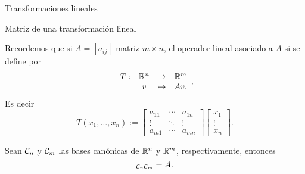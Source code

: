 \begin{chapter}{Transformaciones lineales}
\begin{section}{Matriz de una transformaci\'on lineal}
        
            \begin{observacion*}
                Recordemos que si  $A = [a_{ij}]$ matriz $m \times n$, el operador lineal asociado a $A$ si se define por 
                \begin{align*}
                    \begin{array}{rccc}
                        T : &\mathbb R^n &\to &\mathbb R^m \\
                            &v &\mapsto &Av.
                    \end{array}.
                \end{align*}
                Es decir
                \begin{equation}
                    T(x_1,\ldots,x_n):= \begin{bmatrix} a_{11} &\cdots &a_{1n} \\ \vdots &\ddots& \vdots \\a_{m1} &\cdots &a_{mn}
                    \end{bmatrix}\begin{bmatrix}x_1\\\vdots\\x_n\end{bmatrix}.
                \end{equation}
         	
        
                Sean  $\mathcal{C}_n$ y $\mathcal{C}_m$ las bases canónicas de $\mathbb R^n$ y $\mathbb R^m$,  respectivamente, entonces 
                    \begin{equation*}
                        [T]_{\cC_n\cC_m} =A.
                    \end{equation*}
                \end{observacion*}
    

\end{section}
\end{chapter}
